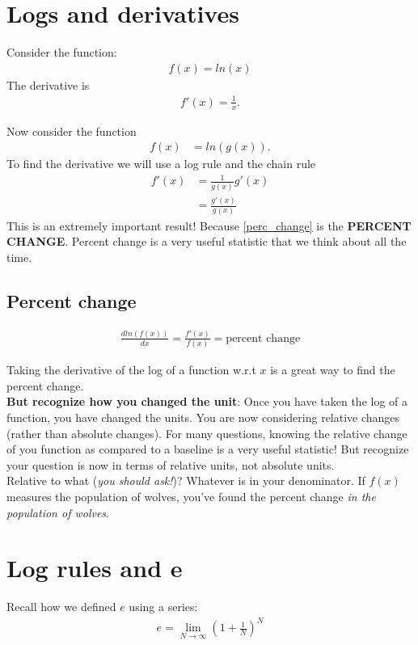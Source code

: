 \documentclass{article}
\begin{document}
\section{Logs and derivatives}
Consider the function: 
\begin{align}
    f(x) = ln(x)
\end{align}
The derivative is 
\begin{align}
    f'(x) = \frac{1}{x}.
\end{align}

Now consider the function 
\begin{align}
    f(x) &= ln(g(x)).
\end{align}
To find the derivative we will use a log rule and the chain rule 
\begin{align}
    f'(x) &= \frac{1}{g(x)} g'(x) \\
    &= \frac{g'(x)}{g(x)} \label{perc_change}
\end{align}
This is an extremely important result! Because \ref{perc_change}
is the \textbf{PERCENT CHANGE}. Percent change is a very useful statistic that we think about all the time. \\

\subsection{Percent change}

\begin{align}
    \frac{d ln(f(x))}{dx} = \frac{f'(x)}{f(x)} = \text{percent change}
\end{align}

Taking the derivative of the log of a function w.r.t $x$ is a great way to find the percent change. \\

\textbf{But recognize how you changed the unit}: Once you have taken the log of a function, you have changed the units. You are now considering relative changes (rather than absolute changes). For many questions, knowing the relative change of you function as compared to a baseline is a very useful statistic! But recognize your question is now in terms of relative units, not absolute units. \\

Relative to what (\textit{you should ask!})? Whatever is in your denominator. If $f(x)$ measures the population of wolves, you've found the percent change \textit{in the population of wolves}.

\section{Log rules and e}
Recall how we defined $e$ using a series:
\begin{align}
    e = \lim_{N \to \infty} (1 + \frac{1}{N})^N
\end{align}
\end{document}

